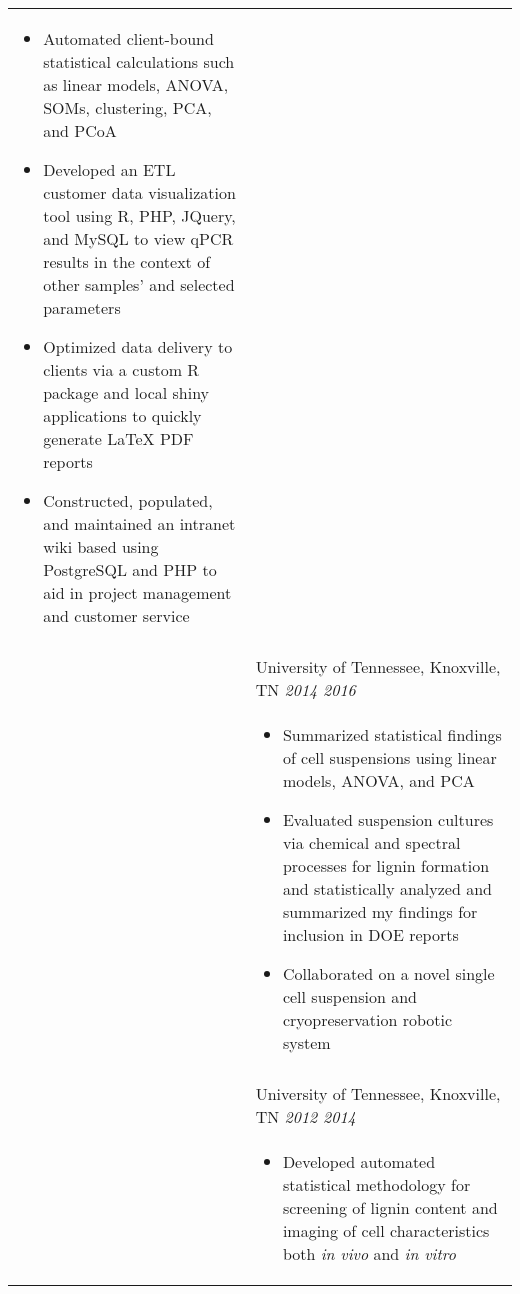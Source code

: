 \documentclass[10pt]{article}%
\begin{document}
\begin{minipage}[ht]{.8\linewidth}
\begin{tabularx}{\linewidth}{p{1.8cm}M}
\begin{itemize}[topsep=-12pt,parsep=0em]
         \item Automated client-bound statistical calculations such as linear models, ANOVA, SOMs, clustering, PCA, and PCoA %
         \item Developed an ETL customer data visualization tool using R, PHP, JQuery, and MySQL to view qPCR results in the context of other samples' and selected parameters %
         \item Optimized data delivery to clients via a custom R package and local shiny applications to quickly generate \LaTeX{} PDF reports  %
         \item Constructed, populated, and maintained an intranet wiki based using PostgreSQL and PHP to aid in project management and customer service
        \end{itemize} \\
       &  \\
       & University of Tennessee, Knoxville, TN \textit{2014 \textemdash{} 2016} \\
       & \begin{itemize}[topsep=-12pt,parsep=0em]
            \setlength\itemsep{0em}
            \item Summarized statistical findings of cell suspensions using linear models, ANOVA, and PCA %
            \item Evaluated suspension cultures via chemical and spectral processes for lignin formation and statistically analyzed and summarized my findings for inclusion in DOE reports %
            \item Collaborated on a novel single cell suspension and cryopreservation robotic system %
         \end{itemize} \\
       &  \\
       & University of Tennessee, Knoxville, TN \textit{2012 \textemdash{} 2014} \\
       & \begin{itemize}[topsep=-12pt,parsep=0em]
            \setlength\itemsep{0em}
            \item Developed automated statistical methodology for screening of lignin content and imaging of cell characteristics both \textit{in vivo} and \textit{in vitro} %

\end{itemize}
\end{tabularx}
\end{minipage}
\end{document}
